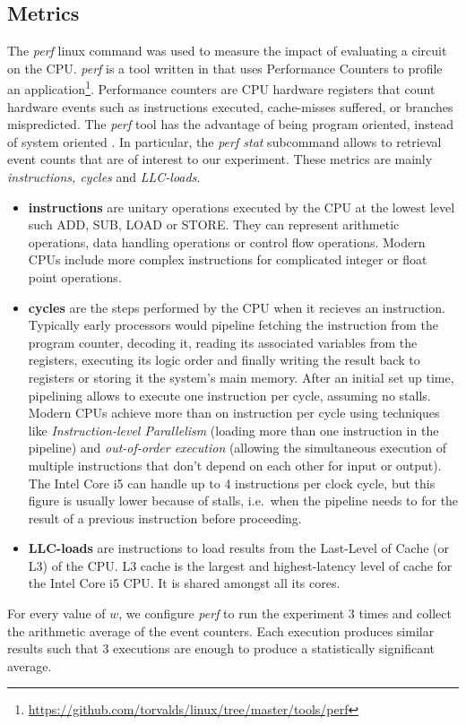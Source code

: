 \subsection{Metrics}
The \textit{perf} linux command was used to measure the impact of evaluating a circuit on the CPU. \textit{perf} is a tool written in  that uses Performance Counters to profile an application\footnote{\url{https://github.com/torvalds/linux/tree/master/tools/perf}}. Performance counters are CPU hardware registers that count hardware events such as instructions executed, cache-misses suffered, or branches mispredicted\cite{perfwiki}. The \textit{perf} tool has the advantage of being program oriented, instead of system oriented \cite{ibm}.   In particular, the \textit{perf stat} subcommand allows to retrieval event counts that are of interest to our experiment. These metrics are mainly \textit{instructions, cycles} and \textit{LLC-loads}. 
\begin{itemize}
\item \textbf{instructions} are unitary operations executed by the CPU at the lowest level such ADD, SUB, LOAD or STORE. They can represent arithmetic operations, data handling operations or control flow operations. Modern CPUs include more complex instructions for complicated integer or float point operations.
\item \textbf{cycles} are the steps performed by the CPU when it recieves an instruction. Typically early processors would pipeline fetching the instruction from the program counter, decoding it, reading its associated variables from the registers, executing its logic order and finally writing the result back to registers or storing it the system's main memory\cite{jmor}. After an initial set up time, pipelining allows to execute one instruction per cycle, assuming no stalls. Modern CPUs achieve more than on instruction per cycle using techniques like \textit{Instruction-level Parallelism} (loading more than one instruction in the pipeline) and \textit{out-of-order execution} (allowing the simultaneous execution of multiple instructions that don't depend on each other for input or output). The Intel Core i5 can handle up to 4 instructions per clock cycle\cite{agner}, but this figure is usually lower because of stalls, i.e.\ when the pipeline needs to for the result of a previous instruction before proceeding.

\item \textbf{LLC-loads} are instructions to load results from the Last-Level of Cache (or L3) of the CPU. L3 cache is the largest and highest-latency level of cache for the Intel Core i5 CPU. It is shared amongst all its cores.

\end{itemize}
For every value of $w$, we configure \textit{perf} to run the experiment 3 times and collect the arithmetic average of the event counters. Each execution produces similar results such that 3 executions are enough to produce a statistically significant average.


